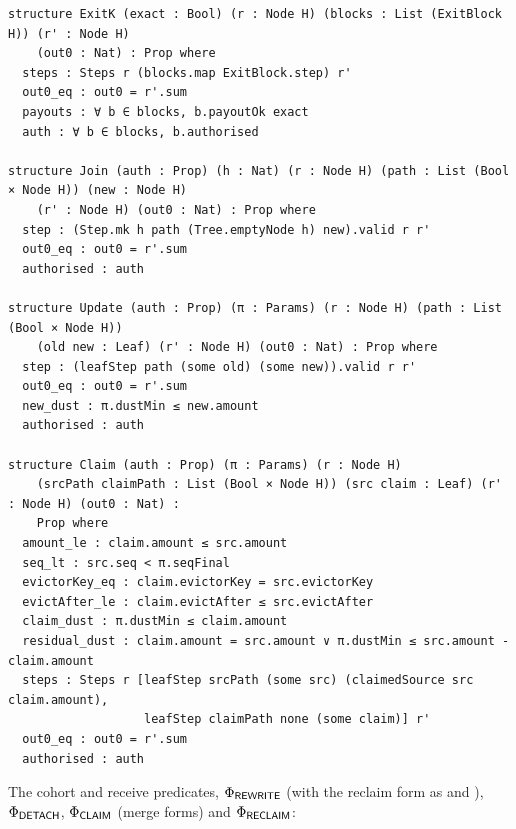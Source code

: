 \begin{lstlisting}[style=leansig]
structure ExitK (exact : Bool) (r : Node H) (blocks : List (ExitBlock H)) (r' : Node H)
    (out0 : Nat) : Prop where
  steps : Steps r (blocks.map ExitBlock.step) r'
  out0_eq : out0 = r'.sum
  payouts : ∀ b ∈ blocks, b.payoutOk exact
  auth : ∀ b ∈ blocks, b.authorised

structure Join (auth : Prop) (h : Nat) (r : Node H) (path : List (Bool × Node H)) (new : Node H)
    (r' : Node H) (out0 : Nat) : Prop where
  step : (Step.mk h path (Tree.emptyNode h) new).valid r r'
  out0_eq : out0 = r'.sum
  authorised : auth

structure Update (auth : Prop) (π : Params) (r : Node H) (path : List (Bool × Node H))
    (old new : Leaf) (r' : Node H) (out0 : Nat) : Prop where
  step : (leafStep path (some old) (some new)).valid r r'
  out0_eq : out0 = r'.sum
  new_dust : π.dustMin ≤ new.amount
  authorised : auth

structure Claim (auth : Prop) (π : Params) (r : Node H)
    (srcPath claimPath : List (Bool × Node H)) (src claim : Leaf) (r' : Node H) (out0 : Nat) :
    Prop where
  amount_le : claim.amount ≤ src.amount
  seq_lt : src.seq < π.seqFinal
  evictorKey_eq : claim.evictorKey = src.evictorKey
  evictAfter_le : claim.evictAfter ≤ src.evictAfter
  claim_dust : π.dustMin ≤ claim.amount
  residual_dust : claim.amount = src.amount ∨ π.dustMin ≤ src.amount - claim.amount
  steps : Steps r [leafStep srcPath (some src) (claimedSource src claim.amount),
                   leafStep claimPath none (some claim)] r'
  out0_eq : out0 = r'.sum
  authorised : auth
\end{lstlisting}

The cohort and receive predicates, $\Phi_{\textsf{REWRITE}}$ (with the reclaim form
as  and ), $\Phi_{\textsf{DETACH}}$,
$\Phi_{\textsf{CLAIM}}$ (merge forms) and $\Phi_{\textsf{RECLAIM}}$:

